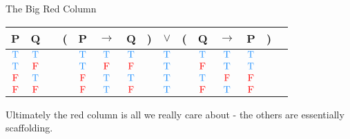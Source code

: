 \documentclass[
  ignorenonframetext,
]{beamer}
\renewcommand{\,}{\text{, }}
\def\True{\textcolor{dodgerblue}{\text{T}}}
\def\False{\textcolor{red}{\text{F}}}
\begin{document}
\begin{frame}{The Big Red Column}
\protect\hypertarget{the-big-red-column-1}{}

\begin{center}
\begin{tabular}{@{ }c@{ }@{ }c | c@{ }@{}c@{}@{ }c@{ }@{ }c@{ }@{ }c@{ }@{}c@{}@{ }c@{ }@{}c@{}@{ }c@{ }@{ }c@{ }@{ }c@{ }@{}c@{}@{ }c}
P & Q &  & ( & P & $\rightarrow$ & Q & ) & $\lor$ & ( & Q & $\rightarrow$ & P & ) & \\
\hline 
$\True$ & $\True$ &  &  & $\True$ & $\True$ & $\True$ &  & \textcolor{red}{$\True$} &  & $\True$ & $\True$ & $\True$ &  & \\
$\True$ & $\False$ &  &  & $\True$ & $\False$ & $\False$ &  & \textcolor{red}{$\True$} &  & $\False$ & $\True$ & $\True$ &  & \\
$\False$ & $\True$ &  &  & $\False$ & $\True$ & $\True$ &  & \textcolor{red}{$\True$} &  & $\True$ & $\False$ & $\False$ &  & \\
$\False$ & $\False$ &  &  & $\False$ & $\True$ & $\False$ &  & \textcolor{red}{$\True$} &  & $\False$ & $\True$ & $\False$ &  & \\
\end{tabular}
\bigskip
\end{center}

Ultimately the red column is all we really care about - the others are
essentially scaffolding.

\end{frame}
\end{document}
